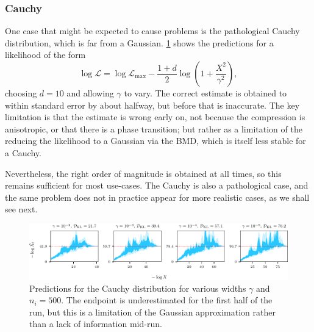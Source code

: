 \documentclass[usenatbib]{mnras}
\newcommand{\nlive}{n_i}
\begin{document}
\subsubsection{Cauchy}
One case that might be expected to cause problems is the pathological Cauchy distribution, which is far from a Gaussian. \cref{fig:cauchy_predictions} shows the predictions for a likelihood of the form
\begin{equation}
	\log\mathcal{L} = \log\mathcal{L}_\mathrm{max} - \frac{1 + d}{2} \log \left(1 + \frac{X^2}{\gamma^2}\right),
\end{equation}
choosing $d = 10$ and allowing $\gamma$ to vary. The correct estimate is obtained to within standard error by about halfway, but before that is inaccurate. The key limitation is that the estimate is wrong early on, not because the compression is anisotropic, or that there is a phase transition; but rather as a limitation of the reducing the likelihood to a Gaussian via the BMD, which is itself less stable for a Cauchy.
\par
Nevertheless, the right order of magnitude is obtained at all times, so this remains sufficient for most use-cases. The Cauchy is also a pathological case, and the same problem does not in practice appear for more realistic cases, as we shall see next.
\begin{figure}
\begin{center}
    \includegraphics{figures/cauchy_predictions.pdf}
\end{center}
\caption{Predictions for the Cauchy distribution for various widths $\gamma$ and $\nlive = 500$. The endpoint is underestimated for the first half of the run, but this is a limitation of the Gaussian approximation rather than a lack of information mid-run.}

\label{fig:cauchy_predictions}
\end{figure}
\end{document}
